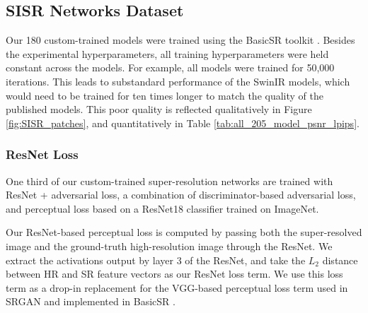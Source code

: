 \documentclass[10pt]{article} %
\begin{document}
\subsection{SISR Networks Dataset}

Our 180 custom-trained models were trained using the BasicSR toolkit \citep{wang2020basicsr}. Besides the experimental hyperparameters, all training hyperparameters were held constant across the models. For example, all models were trained for 50,000 iterations. This leads to substandard performance of the SwinIR models, which would need to be trained for ten times longer to match the quality of the published models. This poor quality is reflected qualitatively in Figure \ref{fig:SISR_patches}, and quantitatively in Table \ref{tab:all_205_model_psnr_lpips}.

\subsubsection{ResNet Loss}

One third of our custom-trained super-resolution networks are trained with ResNet + adversarial loss, a combination of discriminator-based adversarial loss, and perceptual loss based on a ResNet18 classifier trained on ImageNet. 

Our ResNet-based perceptual loss is computed by passing both the super-resolved image and the ground-truth high-resolution image through the ResNet. We extract the activations output by layer 3 of the ResNet, and take the $L_2$ distance between HR and SR feature vectors as our ResNet loss term. We use this loss term as a drop-in replacement for the VGG-based perceptual loss term used in SRGAN \cite{wang2018esrgan} and implemented in BasicSR \cite{wang2020basicsr}.
\end{document}
